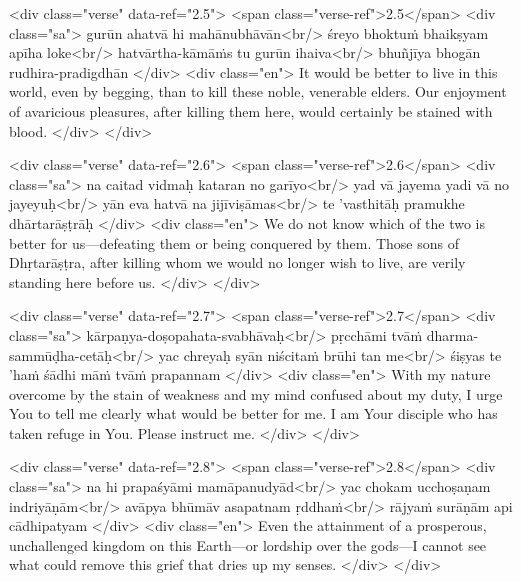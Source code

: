 \begin{html}
<div class="verse" data-ref="2.5">
  <span class="verse-ref">2.5</span>
  <div class="sa">
    gurūn ahatvā hi mahānubhāvān<br/>
    śreyo bhoktuṁ bhaikṣyam apīha loke<br/>
    hatvārtha-kāmāṁs tu gurūn ihaiva<br/>
    bhuñjīya bhogān rudhira-pradigdhān
  </div>
  <div class="en">
    It would be better to live in this world, even by begging, than to kill these noble, venerable elders. Our enjoyment of avaricious pleasures, after killing them here, would certainly be stained with blood.
  </div>
</div>
\end{html}



\begin{html}
<div class="verse" data-ref="2.6">
  <span class="verse-ref">2.6</span>
  <div class="sa">
    na caitad vidmaḥ kataran no garīyo<br/>
    yad vā jayema yadi vā no jayeyuḥ<br/>
    yān eva hatvā na jijīviṣāmas<br/>
    te ’vasthitāḥ pramukhe dhārtarāṣṭrāḥ
  </div>
  <div class="en">
    We do not know which of the two is better for us---defeating them or being conquered by them. Those sons of Dhṛtarāṣṭra, after killing whom we would no longer wish to live, are verily standing here before us.
  </div>
</div>
\end{html}



\begin{html}
<div class="verse" data-ref="2.7">
  <span class="verse-ref">2.7</span>
  <div class="sa">
    kārpaṇya-doṣopahata-svabhāvaḥ<br/>
    pṛcchāmi tvāṁ dharma-sammūḍha-cetāḥ<br/>
    yac chreyaḥ syān niścitaṁ brūhi tan me<br/>
    śiṣyas te ’haṁ śādhi māṁ tvāṁ prapannam
  </div>
  <div class="en">
    With my nature overcome by the stain of weakness and my mind confused about my duty, I urge You to tell me clearly what would be better for me. I am Your disciple who has taken refuge in You. Please instruct me.
  </div>
</div>
\end{html}



\begin{html}
<div class="verse" data-ref="2.8">
  <span class="verse-ref">2.8</span>
  <div class="sa">
    na hi prapaśyāmi mamāpanudyād<br/>
    yac chokam ucchoṣaṇam indriyāṇām<br/>
    avāpya bhūmāv asapatnam ṛddhaṁ<br/>
    rājyaṁ surāṇām api cādhipatyam
  </div>
  <div class="en">
    Even the attainment of a prosperous, unchallenged kingdom on this Earth---or lordship over the gods---I cannot see what could remove this grief that dries up my senses.
  </div>
</div>
\end{html}



